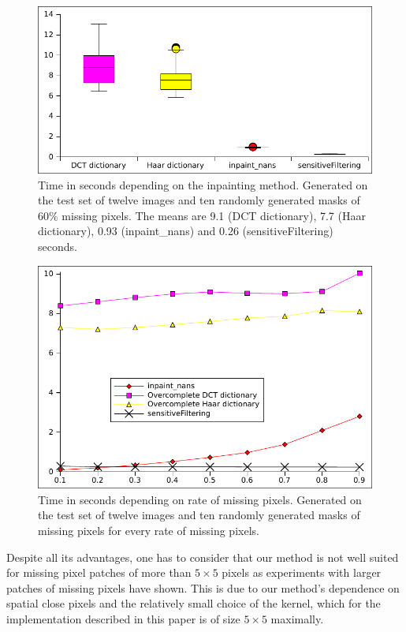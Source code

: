 \documentclass[10pt,conference,compsocconf]{IEEEtran}
\begin{document}
\begin{figure}[ht]
\centering
 \includegraphics[width = \linewidth]{images/timeDependingOnAlgorithm.pdf}
\caption[]{Time in seconds depending on the inpainting method. Generated on the test set of twelve images and ten randomly generated masks of $60\%$ missing pixels. The means are 9.1 (DCT dictionary), 7.7 (Haar dictionary), 0.93 (inpaint\_nans) and 0.26 (sensitiveFiltering) seconds.\label{fig:time_vs_method}} 
\end{figure}


\begin{figure}[ht]
\centering
 \includegraphics[width = \linewidth]{images/timeDependingOnMissingPixels.pdf}
\caption[]{Time in seconds depending on rate of missing pixels. Generated on the test set of twelve images and ten randomly generated masks of missing pixels for every rate of missing pixels.\label{fig:time_vs_missing_pixels}}
\end{figure}

Despite all its advantages, one has to consider that our method is not well suited for missing pixel patches of more than $5 \times 5$ pixels as experiments with larger patches of missing pixels have shown. This is due to our method's dependence on spatial close pixels and the relatively small choice of the kernel, which for the implementation described in this paper is of size $5 \times 5$ maximally.
\end{document}
